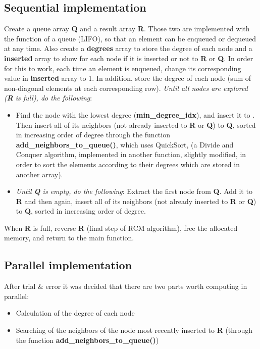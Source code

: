 \documentclass[letterpaper,12pt]{article}
\begin{document}
\subsection{Sequential implementation}
\vspace{2mm} %

Create a queue array \textbf{Q} and a result array \textbf{R}. Those two are implemented with the function of a queue (LIFO), so that an element can be enqueued or dequeued at any time. Also create a \textbf{degrees} array to store the degree of each node and a \textbf{inserted} array to show for each node if it is inserted or not to \textbf{R} or \textbf{Q}. In order for this to work, each time an element is enqueued, change its corresponding value in \textbf{inserted} array to 1. In addition, store the degree of each node (sum of non-diagonal elements at each corresponding row).
\newline\newline
\textit{Until all nodes are explored (\textbf{R} is full), do the following}: 
\begin{itemize}
	\item Find the node with the lowest degree (\textbf{min\_degree\_idx}), and insert it to \textbf{}. Then insert all of its neighbors (not already inserted to \textbf{R} or \textbf{Q}) to \textbf{Q}, sorted in increasing order of degree through the function \textbf{add\_neighbors\_to\_queue()}, which uses QuickSort, (a Divide and Conquer algorithm, implemented in another function, slightly modified, in order to sort the elements according to their degrees which are stored in another array).
	\item \textit{Until \textbf{Q} is empty, do the following}: Extract the first node from \textbf{Q}. Add it to \textbf{R} and then again, insert all of its neighbors (not already inserted to \textbf{R} or \textbf{Q}) to \textbf{Q}, sorted in increasing order of degree.
\end{itemize}
When \textbf{R} is full, reverse \textbf{R} (final step of RCM algorithm), free the allocated memory, and return to the main function.

\subsection{Parallel implementation}
\vspace{2mm} %

After trial \& error it was decided that there are two parts worth computing in parallel:
\begin{itemize}
	\item Calculation of the degree of each node
	\item Searching of the neighbors of the node most recently inserted to \textbf{R} (through the function \textbf{add\_neighbors\_to\_queue()})
\end{itemize}
\end{document}

